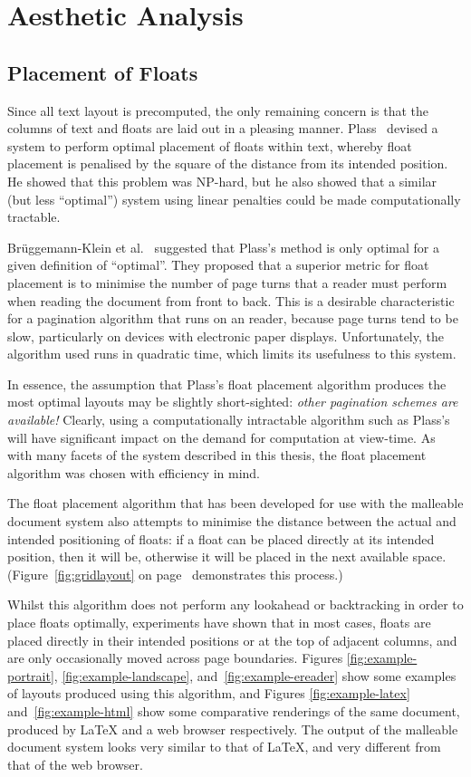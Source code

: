 \chapter{Aesthetic Analysis}\label{ch:aesthetics}

\section{Placement of Floats}
Since all text layout is precomputed, the only remaining concern is that the columns of text and floats are laid out in a pleasing manner. Plass~\cite{Plass1981} devised a system to perform optimal placement of floats within text, whereby float placement is penalised by the square of the distance from its intended position. He showed that this problem was NP-hard, but he also showed that a similar (but less ``optimal'') system using linear penalties could be made computationally tractable.

Br\"uggemann-Klein et al.~\cite{Bruggemann-Klein1995} suggested that Plass's method is only optimal for a given definition of ``optimal''. They proposed that a superior metric for float placement is to minimise the number of page turns that a reader must perform when reading the document from front to back. This is a desirable characteristic for a pagination algorithm that runs on an \ebook{} reader, because page turns tend to be slow, particularly on devices with electronic paper displays. Unfortunately, the algorithm used runs in quadratic time, which limits its usefulness to this system.

In essence, the assumption that Plass's float placement algorithm produces the most optimal layouts may be slightly short-sighted: \emph{other pagination schemes are available!} Clearly, using a computationally intractable algorithm such as Plass's will have significant impact on the demand for computation at view-time. As with many facets of the system described in this thesis, the float placement algorithm was chosen with efficiency in mind.

The float placement algorithm that has been developed for use with the malleable document system also attempts to minimise the distance between the actual and intended positioning of floats: if a float can be placed directly at its intended position, then it will be, otherwise it will be placed in the next available space. (Figure~\ref{fig:gridlayout} on page~\pageref{fig:gridlayout} demonstrates this process.)

Whilst this algorithm does not perform any lookahead or backtracking in order to place floats optimally, experiments have shown that in most cases, floats are placed directly in their intended positions or at the top of adjacent columns, and are only occasionally moved across page boundaries. Figures \ref{fig:example-portrait}, \ref{fig:example-landscape}, and~\ref{fig:example-ereader} show some examples of layouts produced using this algorithm, and Figures \ref{fig:example-latex} and~\ref{fig:example-html} show some comparative renderings of the same document, produced by \LaTeX{} and a web browser respectively. The output of the malleable document system looks very similar to that of \LaTeX, and very different from that of the web browser.

